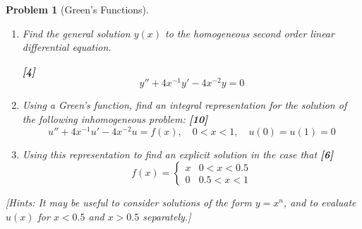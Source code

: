 \documentclass[a4paper]{article}
\theoremstyle{new}
\newtheorem{qns}{Problem}[section]
\begin{document}
\begin{qns}[Green's Functions]\leavevmode
\begin{enumerate}[label=(\alph*)]
\item Find the general solution $y(x)$ to the homogeneous second order linear differential equation.

\hfill \textbf{[4]}
$$y''+4x^{-1}y'-4x^{-2}y=0$$
\item Using a Green's function, find an integral representation for the solution of the following inhomogeneous problem: \hfill \textbf{[10]}
$$u''+4x^{-1}u'-4x^{-2}u=f(x),\quad 0<x<1,\quad u(0)=u(1)=0$$
\item Using this representation to find an explicit solution in the case that \hfill \textbf{[6]}
$$f(x)=
\left\{
        \begin{array}{ll}
      x & 0<x<0.5 \\
      0 & 0.5<x<1
        \end{array}
    \right.$$
\end{enumerate}
[Hints: It may be useful to consider solutions of the form $y=x^n$, and to evaluate $u(x)$ for $x<0.5$ and $x>0.5$ separately.]
\end{qns}
\end{document}
